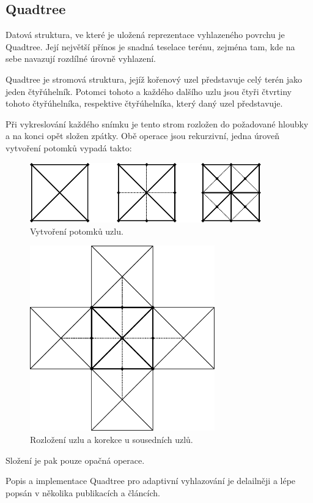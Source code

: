 \documentclass{zcu_sp}
\begin{document}
\subsection{Quadtree}
Datová struktura, ve které je uložená reprezentace vyhlazeného povrchu je
Quadtree. Její největší přínos je snadná teselace terénu, zejména tam, kde na
sebe navazují rozdílné úrovně vyhlazení.

Quadtree je stromová struktura, jejíž kořenový uzel představuje celý terén jako
jeden čtyřúhelník. Potomci tohoto a každého dalšího uzlu jsou čtyři čtvrtiny
tohoto čtyřúhelníka, respektive čtyřúhelníka, který daný uzel představuje.

Při vykreslování každého snímku je tento strom rozložen do požadované
hloubky a na konci opět složen zpátky. Obě operace jsou rekurzivní,
jedna úroveň vytvoření potomků vypadá takto:


\begin{figure}[ht!]
\centering
	\includegraphics[width=10cm]{subd.pdf}
	\caption{Vytvoření potomků uzlu.}
\end{figure}

\begin{figure}[ht!]
\centering
	\includegraphics[width=8cm]{split.pdf}
	\caption{Rozložení uzlu a korekce u sousedních uzlů.}
\end{figure}
Složení je pak pouze opačná operace.

Popis a implementace Quadtree pro adaptivní vyhlazování je delailněji a lépe
popsán v několika publikacích a článcích. \cite{xna-terrain-tutorial}
\end{document}
